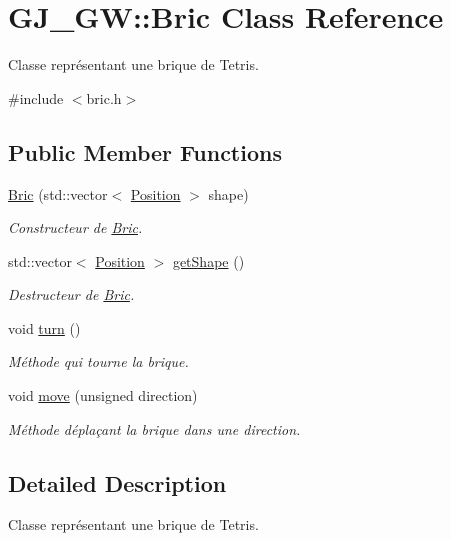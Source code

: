 \hypertarget{class_g_j___g_w_1_1_bric}{}\section{G\+J\+\_\+\+GW\+:\+:Bric Class Reference}
\label{class_g_j___g_w_1_1_bric}


Classe représentant une brique de Tetris.  




{\ttfamily \#include $<$bric.\+h$>$}

\subsection*{Public Member Functions}
\begin{DoxyCompactItemize}
\item 
\hyperlink{class_g_j___g_w_1_1_bric_a40de84f37b5db5de3e77a742220a9e58}{Bric} (std\+::vector$<$ \hyperlink{class_g_j___g_w_1_1_position}{Position} $>$ shape)
\begin{DoxyCompactList}\small\item\em Constructeur de \hyperlink{class_g_j___g_w_1_1_bric}{Bric}. \end{DoxyCompactList}\item 
std\+::vector$<$ \hyperlink{class_g_j___g_w_1_1_position}{Position} $>$ \hyperlink{class_g_j___g_w_1_1_bric_a910b13826a68894212c8735613625a80}{get\+Shape} ()
\begin{DoxyCompactList}\small\item\em Destructeur de \hyperlink{class_g_j___g_w_1_1_bric}{Bric}. \end{DoxyCompactList}\item 
void \hyperlink{class_g_j___g_w_1_1_bric_ac1f67934cba67a59e6917fd0a8af009b}{turn} ()
\begin{DoxyCompactList}\small\item\em Méthode qui tourne la brique. \end{DoxyCompactList}\item 
void \hyperlink{class_g_j___g_w_1_1_bric_abe976548141bc46efc67d6ea6d0fa3ed}{move} (unsigned direction)
\begin{DoxyCompactList}\small\item\em Méthode déplaçant la brique dans une direction. \end{DoxyCompactList}\end{DoxyCompactItemize}


\subsection{Detailed Description}
Classe représentant une brique de Tetris. 

